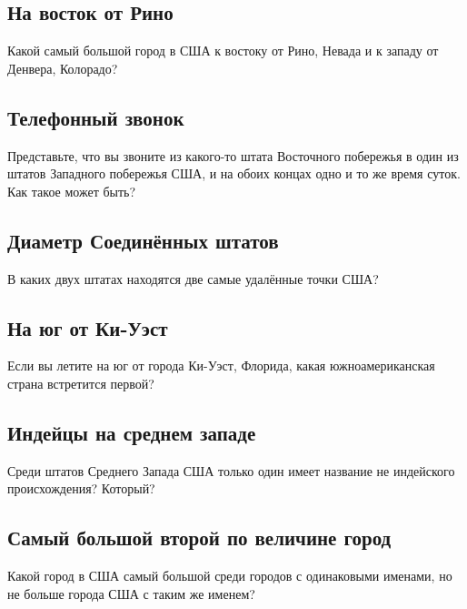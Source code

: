 \subsection*{На восток от Рино}%

Какой самый большой город в США к востоку от Рино, Невада и к западу от Денвера, Колорадо? 

\subsection*{Телефонный звонок}%

Представьте, что вы звоните из какого-то штата Восточного побережья в один из штатов Западного побережья США, и на обоих концах одно и то же время суток.
Как такое может быть? 
  

\subsection*{Диаметр Соединённых штатов}%

В каких двух штатах находятся две самые удалённые точки США? 
  

\subsection*{На юг от Ки-Уэст}%

Если вы летите на юг от города Ки-Уэст, Флорида, какая южноамериканская страна 
встретится первой? 

\subsection*{Индейцы на среднем западе}%

Среди штатов Среднего Запада США только один имеет название не индейского происхождения? Который?    

\subsection*{Самый большой второй по величине город}%

Какой город в США самый большой среди городов с одинаковыми именами, но не больше города США с таким же именем?

